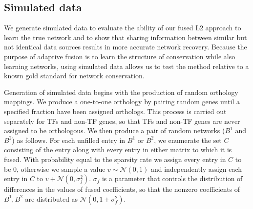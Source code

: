 \documentclass[11pt]{article}
\begin{document}



\subsection{Simulated data}
We generate simulated data to evaluate the ability of our fused L2 approach to learn the true network and to show that sharing information between similar but not identical data sources results in more accurate network recovery. Because the purpose of adaptive fusion is to learn the structure of conservation while also learning networks, using simulated data allows us to test the method relative to a known gold standard for network conservation. 


Generation of simulated data begins with the production of random orthology mappings. We produce a one-to-one orthology by pairing random genes until a specified fraction have been assigned orthologs. This process is carried out separately for TFs and non-TF genes, so that TFs and non-TF genes are never assigned to be orthologous. We then produce a pair of random networks ($B^1$ and $B^2$) as follows. For each unfilled entry in $B^1$ or $B^2$, we enumerate the set $C$ consisting of the entry along with every entry in either matrix to which it is fused. With probability equal to the sparsity rate we assign every entry in $C$ to be 0, otherwise we sample a value $v \sim \mathcal{N}(0,1)$ and independently assign each entry in $C$ to $v + \mathcal{N}(0, \sigma_f^2)$. $\sigma_f$ is a parameter that controls the distribution of differences in the values of fused coefficients, so that the nonzero coefficients of $B^1, B^2$ are distributed as $\mathcal{N}(0, 1 + \sigma_f^2)$.
\end{document}
